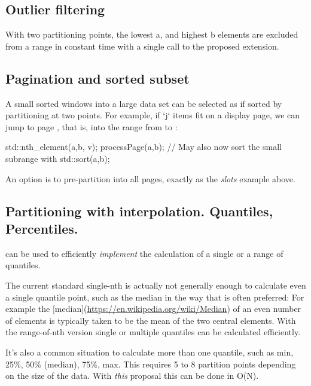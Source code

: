 \subsection{Outlier filtering}

With two partitioning points, the lowest a, and highest b elements are excluded from a range in constant time with a single call to the proposed extension.

\subsection{Pagination and sorted subset}

A small sorted windows into a large data set can be selected as if sorted by partitioning at two points. For example, if `j` items fit on a display page, we can jump to page , that is, into the range from  to :

\begin{codeblock}
std::nth_element({a,b}, v);
processPage(a,b); // May also now sort the small subrange with std::sort(a,b);
\end{codeblock}

An option is to pre-partition into all pages, exactly as the \emph{slots} example above.

\subsection{Partitioning with interpolation. Quantiles, Percentiles.}


 can be used to efficiently \emph{implement} the calculation of a single or a range of quantiles.

The current standard single-nth  is actually not generally enough to calculate even a single quantile point, such as the median in the way that is often preferred: For example the [median](\url{https://en.wikipedia.org/wiki/Median}) of an even number of elements is typically taken  to be the mean of the two central elements. With the range-of-nth  version single or multiple quantiles can be calculated efficiently.

It's also a common situation to calculate more than one quantile, such as min, 25\%, 50\% (median), 75\%, max. This requires 5 to 8 partition points depending on the size of the data. With \emph{this} proposal this can be done in O(N).

